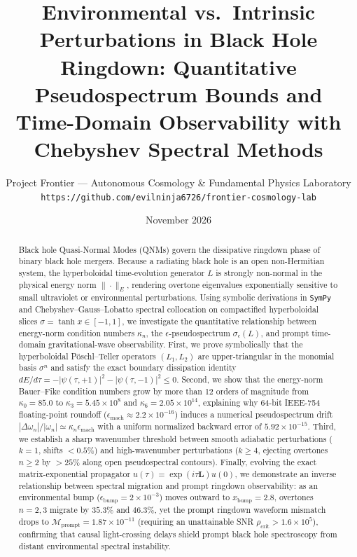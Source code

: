\documentclass[11pt,a4paper]{article}
\title{\textbf{Environmental vs.\ Intrinsic Perturbations in Black Hole Ringdown: Quantitative Pseudospectrum Bounds and Time-Domain Observability with Chebyshev Spectral Methods}}
\author{Project Frontier — Autonomous Cosmology \& Fundamental Physics Laboratory\\
\texttt{https://github.com/evilninja6726/frontier-cosmology-lab}}
\date{November 2026}
\begin{document}
\maketitle

\begin{abstract}
Black hole Quasi-Normal Modes (QNMs) govern the dissipative ringdown phase of binary black hole mergers. Because a radiating black hole is an open non-Hermitian system, the hyperboloidal time-evolution generator $L$ is strongly non-normal in the physical energy norm $\|\cdot\|_E$, rendering overtone eigenvalues exponentially sensitive to small ultraviolet or environmental perturbations. Using symbolic derivations in \texttt{SymPy} and Chebyshev--Gauss--Lobatto spectral collocation on compactified hyperboloidal slices $\sigma = \tanh x \in [-1, 1]$, we investigate the quantitative relationship between energy-norm condition numbers $\kappa_n$, the $\epsilon$-pseudospectrum $\sigma_\epsilon(L)$, and prompt time-domain gravitational-wave observability. First, we prove symbolically that the hyperboloidal P\"oschl--Teller operators $(L_1, L_2)$ are upper-triangular in the monomial basis $\sigma^n$ and satisfy the exact boundary dissipation identity $dE/d\tau = -|\psi(\tau, +1)|^2 - |\psi(\tau, -1)|^2 \le 0$. Second, we show that the energy-norm Bauer--Fike condition numbers grow by more than 12 orders of magnitude from $\kappa_0 = 85.0$ to $\kappa_3 = 5.45 \times 10^8$ and $\kappa_6 = 2.05 \times 10^{14}$, explaining why 64-bit IEEE-754 floating-point roundoff ($\epsilon_{\mathrm{mach}} \approx 2.2 \times 10^{-16}$) induces a numerical pseudospectrum drift $|\Delta\omega_n|/|\omega_n| \simeq \kappa_n \epsilon_{\mathrm{mach}}$ with a uniform normalized backward error of $5.92 \times 10^{-15}$. Third, we establish a sharp wavenumber threshold between smooth adiabatic perturbations ($k=1$, shifts $< 0.5\%$) and high-wavenumber perturbations ($k \ge 4$, ejecting overtones $n \ge 2$ by $> 25\%$ along open pseudospectral contours). Finally, evolving the exact matrix-exponential propagator $u(\tau) = \exp(i\tau\mathbf{L})u(0)$, we demonstrate an inverse relationship between spectral migration and prompt ringdown observability: as an environmental bump ($\epsilon_{\mathrm{bump}} = 2 \times 10^{-3}$) moves outward to $x_{\mathrm{bump}} = 2.8$, overtones $n = 2, 3$ migrate by $35.3\%$ and $46.3\%$, yet the prompt ringdown waveform mismatch drops to $\mathcal{M}_{\mathrm{prompt}} = 1.87 \times 10^{-11}$ (requiring an unattainable SNR $\rho_{\mathrm{crit}} > 1.6 \times 10^5$), confirming that causal light-crossing delays shield prompt black hole spectroscopy from distant environmental spectral instability.
\end{abstract}
\end{document}
